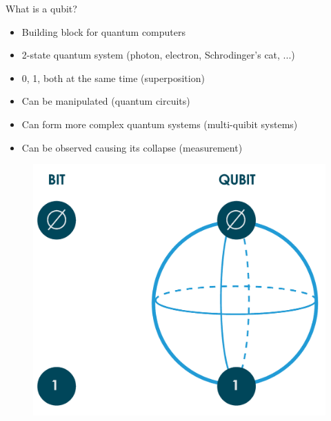 \begin{frame}{What is a qubit?}

		\begin{itemize}
			\item Building block for quantum computers
			\item 2-state quantum system (photon, electron, Schrodinger's cat, ...)
			\item 0, 1, both at the same time (superposition)
			\item Can be manipulated (quantum circuits)
			\item Can form more complex quantum systems (multi-quibit systems)
			\item Can be observed causing its collapse (measurement)
		\end{itemize}
		
		\begin{figure}[H]
          \centering
            \includegraphics[width=.4\linewidth]{assets/Qubit.png}
        \end{figure}
    
\end{frame}

